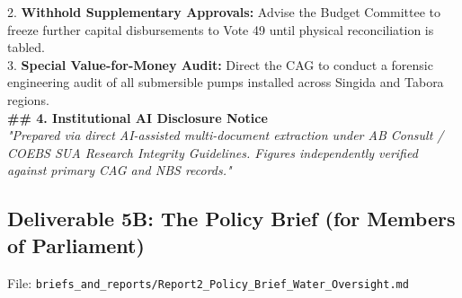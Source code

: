 \documentclass[11pt, a4paper]{report}
\begin{document}
\begin{tcolorbox}[colback=lightgrey, colframe=bordergrey, title=\textbf{Deliverable 5A Preview: \texttt{Report1\_Executive\_Water\_Oversight.md}}]
2. \textbf{Withhold Supplementary Approvals:} Advise the Budget Committee to freeze further capital disbursements to Vote 49 until physical reconciliation is tabled.\\
3. \textbf{Special Value-for-Money Audit:} Direct the CAG to conduct a forensic engineering audit of all submersible pumps installed across Singida and Tabora regions.\\[0.2cm]
\textbf{\#\# 4. Institutional AI Disclosure Notice}\\
\textit{"Prepared via direct AI-assisted multi-document extraction under AB Consult / COEBS SUA Research Integrity Guidelines. Figures independently verified against primary CAG and NBS records."}
\end{tcolorbox}

\newpage

\subsection{Deliverable 5B: The Policy Brief (for Members of Parliament)}
File: \texttt{briefs\_and\_reports/Report2\_Policy\_Brief\_Water\_Oversight.md}
\end{document}
